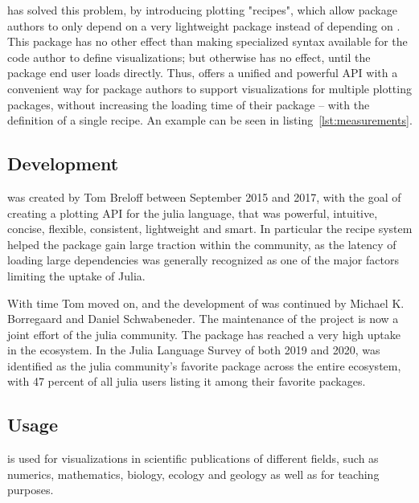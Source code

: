 \documentclass[a4paper]{article}
\begin{document}
\Plots has solved this problem, by introducing plotting "recipes", which allow package authors to only depend on a very lightweight package  instead of depending on \Plots.
This package has no other effect than making specialized syntax available for the code author to define visualizations; but otherwise has no effect, until the package end user loads \Plots directly.
Thus, \Plots offers a unified and powerful API with a convenient way for package authors to support visualizations for multiple plotting packages, without increasing the loading time of their package – with the definition of a single recipe.
An example can be seen in listing~\ref{lst:measurements}.

\subsection*{Development}

\Plots was created by Tom Breloff between September 2015 and 2017, with the goal of creating a plotting API for the julia\cite{bezansonJuliaFreshApproach2017a} language, that was powerful, intuitive, concise, flexible, consistent, lightweight and smart.
In particular the recipe system helped the package gain large traction within the community, as the latency of loading large dependencies was generally recognized as one of the major factors limiting the uptake of Julia.

With time Tom moved on, and the development of \Plots was continued by Michael K. Borregaard and Daniel Schwabeneder.
The maintenance of the project is now a joint effort of the julia community.
The package has reached a very high uptake in the ecosystem.
In the Julia Language Survey of both 2019\cite{shahJuliaUserDeveloper} and 2020\cite{shah2020JuliaUser}, \Plots was identified as the julia community's favorite package across the entire ecosystem, with 47 percent of all julia users listing it among their favorite packages.

\subsection*{Usage}

\Plots is used for visualizations in scientific publications of different fields, such as numerics\cite{rackauckasDifferentialEquationsJlPerformant2017a,baggecarlsonMonteCarloMeasurementsJlPropagation2019,caldwellBATJlUpgrading2020,cufarRipsererJlFlexible2020,fairbrotherGaussianProcessesJlNonparametric2019,lindnerNetworkDynamicsJlComposing2021}, mathematics\cite{driscollComplexRegionsJlJulia2019}, biology\cite{angevaareInfectiousDiseaseTransmission2020,bonhamMicrobiomeJlBiobakeryUtils2021}, ecology\cite{dansereauSimpleSDMLayersJlGBIF2021} and geology\cite{constantinouGeophysicalFlowsJlSolvers2021,KellerSilicaCrust2020} as well as for teaching purposes\cite{boydIntroductionAppliedLinear2018,IntroductionComputationalThinking}.
\end{document}
